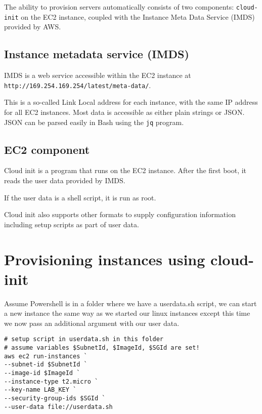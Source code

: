 The ability to provision servers automatically consists of two
components: \texttt{cloud-init} on the EC2 instance, coupled with the
Instance Meta Data Service (IMDS) provided by AWS.

\subsection{Instance metadata service
(IMDS)}\label{instance-metadata-service-imds}

IMDS is a web service accessible within the EC2 instance at\\
\texttt{http://169.254.169.254/latest/meta-data/}.

This is a so-called Link Local address for each instance, with the same
IP address for all EC2 instances. Most data is accessible as either
plain strings or JSON. JSON can be parsed easily in Bash using the
\texttt{jq} program.

\subsection{EC2 component}\label{ec2-component}

Cloud init is a program that runs on the EC2 instance. After the first
boot, it reads the user data provided by IMDS.

If the user data is a shell script, it is run as root.

Cloud init also supports other formats to supply configuration
information including setup scripts as part of user data.

\section{Provisioning instances using
cloud-init}\label{provisioning-instances-using-cloud-init}

Assume Powershell is in a folder where we have a userdata.sh script, we
can start a new instance the same way as we started our linux instances
except this time we now pass an additional argument with our user data.

\begin{verbatim}
# setup script in userdata.sh in this folder
# assume variables $SubnetId, $ImageId, $SGId are set!
aws ec2 run-instances `
--subnet-id $SubnetId `
--image-id $ImageId `
--instance-type t2.micro `
--key-name LAB_KEY `
--security-group-ids $SGId `
--user-data file://userdata.sh 
\end{verbatim}

